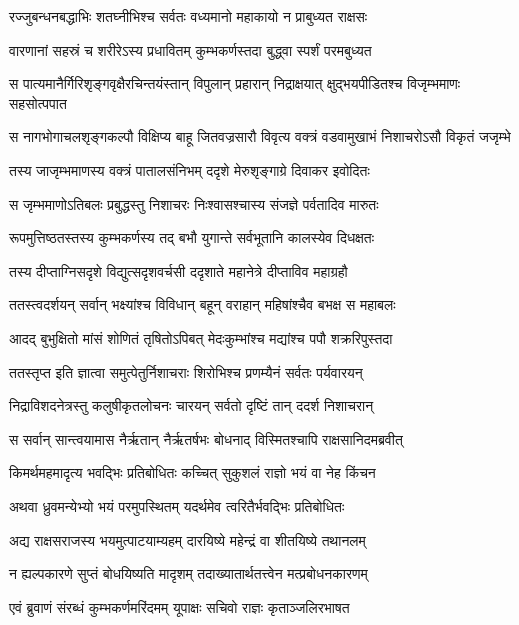 \twolineshloka
{रज्जुबन्धनबद्धाभिः शतघ्नीभिश्च सर्वतः}
{वध्यमानो महाकायो न प्राबुध्यत राक्षसः} %

\twolineshloka
{वारणानां सहस्रं च शरीरेऽस्य प्रधावितम्}
{कुम्भकर्णस्तदा बुद्ध्वा स्पर्शं परमबुध्यत} %

\twolineshloka
{स पात्यमानैर्गिरिशृङ्गवृक्षैरचिन्तयंस्तान् विपुलान् प्रहारान्}
{निद्राक्षयात् क्षुद्भयपीडितश्च विजृम्भमाणः सहसोत्पपात} %

\twolineshloka
{स नागभोगाचलशृङ्गकल्पौ विक्षिप्य बाहू जितवज्रसारौ}
{विवृत्य वक्त्रं वडवामुखाभं निशाचरोऽसौ विकृतं जजृम्भे} %

\twolineshloka
{तस्य जाजृम्भमाणस्य वक्त्रं पातालसंनिभम्}
{ददृशे मेरुशृङ्गाग्रे दिवाकर इवोदितः} %

\twolineshloka
{स जृम्भमाणोऽतिबलः प्रबुद्धस्तु निशाचरः}
{निःश्वासश्चास्य संजज्ञे पर्वतादिव मारुतः} %

\twolineshloka
{रूपमुत्तिष्ठतस्तस्य कुम्भकर्णस्य तद् बभौ}
{युगान्ते सर्वभूतानि कालस्येव दिधक्षतः} %

\twolineshloka
{तस्य दीप्ताग्निसदृशे विद्युत्सदृशवर्चसी}
{ददृशाते महानेत्रे दीप्ताविव महाग्रहौ} %

\twolineshloka
{ततस्त्वदर्शयन् सर्वान् भक्ष्यांश्च विविधान् बहून्}
{वराहान् महिषांश्चैव बभक्ष स महाबलः} %

\twolineshloka
{आदद् बुभुक्षितो मांसं शोणितं तृषितोऽपिबत्}
{मेदःकुम्भांश्च मद्यांश्च पपौ शक्ररिपुस्तदा} %

\twolineshloka
{ततस्तृप्त इति ज्ञात्वा समुत्पेतुर्निशाचराः}
{शिरोभिश्च प्रणम्यैनं सर्वतः पर्यवारयन्} %

\twolineshloka
{निद्राविशदनेत्रस्तु कलुषीकृतलोचनः}
{चारयन् सर्वतो दृष्टिं तान् ददर्श निशाचरान्} %

\twolineshloka
{स सर्वान् सान्त्वयामास नैर्ऋतान् नैर्ऋतर्षभः}
{बोधनाद् विस्मितश्चापि राक्षसानिदमब्रवीत्} %

\twolineshloka
{किमर्थमहमादृत्य भवद्भिः प्रतिबोधितः}
{कच्चित् सुकुशलं राज्ञो भयं वा नेह किंचन} %

\twolineshloka
{अथवा ध्रुवमन्येभ्यो भयं परमुपस्थितम्}
{यदर्थमेव त्वरितैर्भवद्भिः प्रतिबोधितः} %

\twolineshloka
{अद्य राक्षसराजस्य भयमुत्पाटयाम्यहम्}
{दारयिष्ये महेन्द्रं वा शीतयिष्ये तथानलम्} %

\twolineshloka
{न ह्यल्पकारणे सुप्तं बोधयिष्यति मादृशम्}
{तदाख्यातार्थतत्त्वेन मत्प्रबोधनकारणम्} %

\twolineshloka
{एवं ब्रुवाणं संरब्धं कुम्भकर्णमरिंदमम्}
{यूपाक्षः सचिवो राज्ञः कृताञ्जलिरभाषत} %

